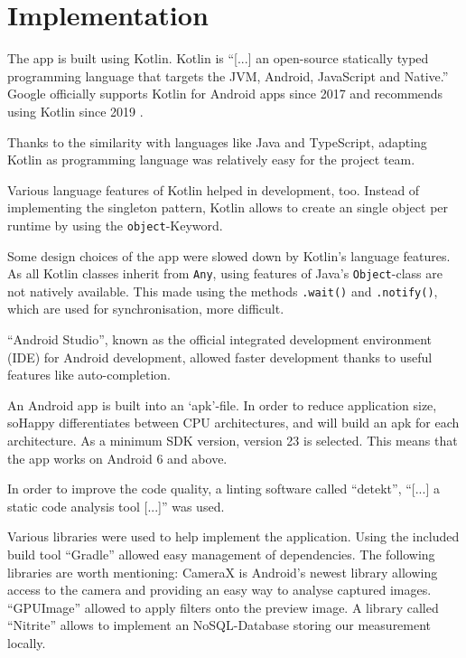\section{Implementation} \label{sec:implementation}

The app is built using Kotlin. Kotlin is ``[...] an open-source statically 
typed programming language that targets the JVM, Android, JavaScript and 
Native.'' \cite{kotlin2020}
Google officially supports Kotlin for Android apps since 2017
\cite{googleio2017} and recommends using Kotlin since 2019
\cite{androidkotlin2019}.

Thanks to the similarity with languages like Java and TypeScript, adapting
Kotlin as programming language was relatively easy for the project team.

Various language features of Kotlin helped in development, too. Instead of
implementing the singleton pattern, Kotlin allows to create an single object
per runtime by using the \texttt{object}-Keyword.

Some design choices of the app were slowed down by Kotlin's language features.
As all Kotlin classes inherit from \texttt{Any}, using features of Java's 
\texttt{Object}-class are not natively available. This made using the methods
\texttt{.wait()} and \texttt{.notify()}, which are used for synchronisation,
more difficult.

``Android Studio'', known as the official integrated development environment 
(IDE) for Android development, allowed faster development thanks to useful
features like auto-completion. 

An Android app is built into an `apk'-file. In order to reduce application
size, soHappy differentiates between CPU architectures, and will
build an apk for each architecture. As a minimum SDK version, version 23
is selected. This means that the app works on Android 6 and above.

In order to improve the code quality, a linting software called ``detekt'',
``[...] a static code analysis tool [...]''\cite{detekt2020} was used.

Various libraries were used to help implement the application. Using
the included build tool ``Gradle'' \cite{gradle} allowed easy management of 
dependencies. The following libraries are worth mentioning: CameraX 
\cite{camerax} is Android's newest library allowing access to the camera and 
providing an easy way to analyse captured images. ``GPUImage'' \cite{gpuimage}
allowed to apply filters onto the preview image. A library called ``Nitrite''
\cite{nitrite} allows to implement an NoSQL-Database storing our measurement 
locally.

